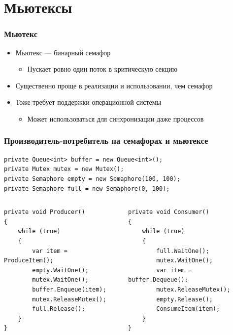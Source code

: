 \documentclass[xetex,mathserif,serif]{beamer}
\begin{document}
    \section{Мьютексы}

    \begin{frame}
        \frametitle{Мьютекс}
        \begin{itemize}
            \item Мьютекс --- бинарный семафор
            \begin{itemize}
                \item Пускает ровно один поток в критическую секцию
            \end{itemize}
            \item Существенно проще в реализации и использовании, чем семафор
            \item Тоже требует поддержки операционной системы
            \begin{itemize}
                \item Может использоваться для синхронизации даже процессов
            \end{itemize}
        \end{itemize}
    \end{frame}

    \begin{frame}[fragile]
        \frametitle{Производитель-потребитель на семафорах и мьютексе}
        \begin{footnotesize}
            \begin{verbatim}
private Queue<int> buffer = new Queue<int>();
private Mutex mutex = new Mutex();
private Semaphore empty = new Semaphore(100, 100);
private Semaphore full = new Semaphore(0, 100);
            \end{verbatim}
            \begin{columns}
                \begin{column}{0.5\textwidth}
                    \begin{verbatim}
private void Producer()
{
    while (true)
    {
        var item = ProduceItem();
        empty.WaitOne();
        mutex.WaitOne();
        buffer.Enqueue(item);
        mutex.ReleaseMutex();
        full.Release();
    }
}
                    \end{verbatim}
                \end{column}
                \begin{column}{0.5\textwidth}
                    \begin{verbatim}
private void Consumer()
{
    while (true)
    {
        full.WaitOne();
        mutex.WaitOne();
        var item = buffer.Dequeue();
        mutex.ReleaseMutex();
        empty.Release();
        ConsumeItem(item);
    }
}
                    \end{verbatim}
                \end{column}
            \end{columns}
        \end{footnotesize}
    \end{frame}
\end{document}

